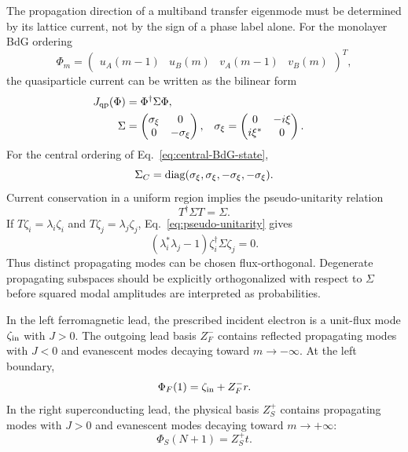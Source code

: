 The propagation direction of a multiband transfer eigenmode must be determined by its lattice current, not by the sign of a phase label alone.  For the monolayer BdG ordering
\begin{equation}
    \Phi_m=
    \begin{pmatrix}
        u_A(m-1)&u_B(m)&v_A(m-1)&v_B(m)
    \end{pmatrix}^{T},
\end{equation}
the quasiparticle current can be written as the bilinear form
\begin{align}
    J_{\rm qp}(\Phi)
    &=\Phi^\dagger\Sigma\Phi,
    \label{eq:lead-flux-metric}\\
    \Sigma
    &=
    \begin{pmatrix}
        \sigma_\xi & 0\\
        0 & -\sigma_\xi
    \end{pmatrix},
    &
    \sigma_\xi
    &=
    \begin{pmatrix}
        0 & -i\xi\\
        i\xi^* & 0
    \end{pmatrix}.
    \notag
\end{align}
For the central ordering of Eq.~\eqref{eq:central-BdG-state},
\begin{equation}
    \Sigma_C=
    \operatorname{diag}(\sigma_\xi,\sigma_\xi,-\sigma_\xi,-\sigma_\xi).
    \label{eq:central-flux-metric}
\end{equation}
Current conservation in a uniform region implies the pseudo-unitarity relation
\begin{equation}
    T^\dagger\Sigma T=\Sigma.
    \label{eq:pseudo-unitarity}
\end{equation}
If $T\zeta_i=\lambda_i\zeta_i$ and $T\zeta_j=\lambda_j\zeta_j$, Eq.~\eqref{eq:pseudo-unitarity} gives
\begin{equation}
    \left(\lambda_i^*\lambda_j-1\right)
    \zeta_i^\dagger\Sigma\zeta_j=0.
    \label{eq:flux-orthogonality}
\end{equation}
Thus distinct propagating modes can be chosen flux-orthogonal.  Degenerate propagating subspaces should be explicitly orthogonalized with respect to $\Sigma$ before squared modal amplitudes are interpreted as probabilities.

In the left ferromagnetic lead, the prescribed incident electron is a unit-flux mode $\zeta_{\rm in}$ with $J>0$.  The outgoing lead basis $Z_F^-$ contains reflected propagating modes with $J<0$ and evanescent modes decaying toward $m\to-\infty$.  At the left boundary,
\begin{equation}
    \Phi_F(1)=\zeta_{\rm in}+Z_F^- r.
    \label{eq:left-lead-state}
\end{equation}
In the right superconducting lead, the physical basis $Z_S^+$ contains propagating modes with $J>0$ and evanescent modes decaying toward $m\to+\infty$:
\begin{equation}
    \Phi_S(N+1)=Z_S^+ t.
    \label{eq:right-lead-state}
\end{equation}

